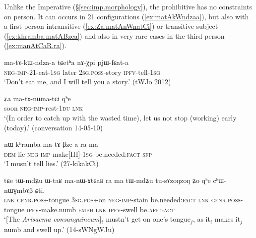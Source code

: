 Unlike the Imperative (§\ref{sec:imp.morphology}), the prohibitive has no constraints on person. It can occurs in 2\fl{}1 configurations (\ref{ex:matAkWndzaa}), but also with a first person intransitive (\ref{ex:Za.matAnWnatCi}) or transitive subject (\ref{ex:khramba.matABzea}) and also in very rare cases in the third person (\ref{ex:manAtCaR.ra}).

\begin{exe}
\ex  \label{ex:matAkWndzaa}
\gll ma-tɤ-kɯ-ndza-a tɕetʰa nɤ-χpi pjɯ-fɕat-a \\
\textsc{neg}-\textsc{imp}-2\fl{}1-eat-\textsc{1sg} later \textsc{2sg}.\textsc{poss}-story \textsc{ipfv}-tell-\textsc{1sg} \\
\glt `Don't eat me, and I will tell you a story.' (tWJo 2012) 
\end{exe}
 
\begin{exe}
\ex  \label{ex:Za.matAnWnatCi}
\gll ʑa ma-tɤ-nɯna-tɕi qʰe \\
soon \textsc{neg}-\textsc{imp}-rest-\textsc{1du} \textsc{lnk} \\
\glt `(In order to catch up with the wasted time), let us not stop (working) early (today).' (conversation 14-05-10)
\end{exe}

\begin{exe}
\ex  \label{ex:khramba.matABzea}
\gll nɯ kʰramba ma-tɤ-βze-a ra ma \\
\textsc{dem} lie  \textsc{neg}-\textsc{imp}-make[III]-\textsc{1sg} be.needed:\textsc{fact} \textsc{sfp} \\
\glt `I musn't tell lies.' (27-kikakCi)
\end{exe}

\begin{exe}
\ex  \label{ex:manAtCaR.ra}
\gll tɕe tɯ-mdʑu ɯ-taʁ ma-nɯ-ɤtɕaʁ ra ma tɯ-mdʑu tu-sɤzoŋzoŋ ʑo qʰe cʰɯ-nɯɣmbɤβ ɕti. \\
\textsc{lnk} \textsc{genr}.\textsc{poss}-tongue \textsc{3sg}.\textsc{poss}-on \textsc{neg}-\textsc{imp}-stain be.needed:\textsc{fact} \textsc{lnk} \textsc{genr}.\textsc{poss}-tongue \textsc{ipfv}-make.numb \textsc{emph} \textsc{lnk} \textsc{ipfv}-swell be.\textsc{aff}:\textsc{fact} \\
\glt `[The \textit{Arisaema consanguineum}]$_i$ mustn't get on one's tongue$_j$, as it$_i$ makes it$_j$ numb and swell up.' (14-sWNgWJu)
\end{exe}

